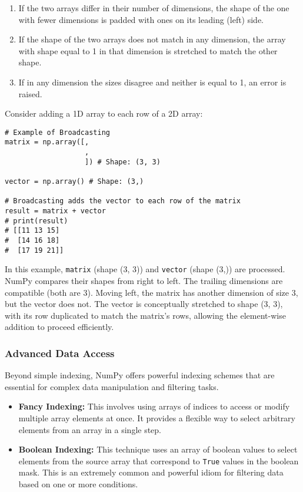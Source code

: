 \documentclass[11pt,a4paper]{article}
\begin{document}
\begin{enumerate}
    \item If the two arrays differ in their number of dimensions, the shape of the one with fewer dimensions is padded with ones on its leading (left) side.
    \item If the shape of the two arrays does not match in any dimension, the array with shape equal to 1 in that dimension is stretched to match the other shape.
    \item If in any dimension the sizes disagree and neither is equal to 1, an error is raised.
\end{enumerate}

Consider adding a 1D array to each row of a 2D array:

\begin{lstlisting}
# Example of Broadcasting
matrix = np.array([,
                   ,
                   ]) # Shape: (3, 3)

vector = np.array() # Shape: (3,)

# Broadcasting adds the vector to each row of the matrix
result = matrix + vector
# print(result)
# [[11 13 15]
#  [14 16 18]
#  [17 19 21]]
\end{lstlisting}

In this example, \texttt{matrix} (shape (3, 3)) and \texttt{vector} (shape (3,)) are processed. NumPy compares their shapes from right to left. The trailing dimensions are compatible (both are 3). Moving left, the matrix has another dimension of size 3, but the vector does not. The vector is conceptually stretched to shape (3, 3), with its row \texttt{} duplicated to match the matrix's rows, allowing the element-wise addition to proceed efficiently.

\subsubsection{Advanced Data Access}

Beyond simple indexing, NumPy offers powerful indexing schemes that are essential for complex data manipulation and filtering tasks.

\begin{itemize}
    \item \textbf{Fancy Indexing:} This involves using arrays of indices to access or modify multiple array elements at once. It provides a flexible way to select arbitrary elements from an array in a single step.
    \item \textbf{Boolean Indexing:} This technique uses an array of boolean values to select elements from the source array that correspond to \texttt{True} values in the boolean mask. This is an extremely common and powerful idiom for filtering data based on one or more conditions.
\end{itemize}
\end{document}
